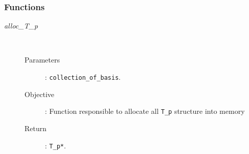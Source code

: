 \documentclass[11pt,a4paper]{article}
\begin{document}
\subsubsection{Functions}
\begin{description}
	\item [\textit{alloc\_T\_p}] \hfill \\[-0.5cm]
		\begin{description}
			\item [Parameters]: \texttt{collection\_of\_basis}.
			\item [Objective]: Function responsible to allocate all \texttt{T\_p} 
				structure into memory
			\item [Return]: \texttt{T\_p*}.
		\end{description}
\end{description}
\end{document}
